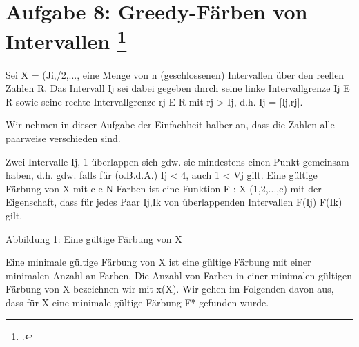 \documentclass{lehramt-informatik-aufgabe}
\begin{document}
\section{Aufgabe 8: Greedy-Färben von Intervallen
\footcite[Thema 1 Aufgabe 8]{examen:66115:2017:09}}

Sei X = (Ji,/2,..., eine Menge von n (geschlossenen) Intervallen über
den reellen Zahlen R. Das Intervall Ij sei dabei gegeben dnrch seine
linke Intervallgrenze Ij E R sowie seine rechte Intervallgrenze rj E R
mit rj > Ij, d.h. Ij = [lj,rj].

Wir nehmen in dieser Aufgabe der Einfachheit halber an, dass die Zahlen
alle paarweise verschieden sind.

Zwei Intervalle Ij, 1 überlappen sich gdw. sie mindestens einen Punkt
gemeinsam haben, d.h. gdw. falls für (o.B.d.A.) Ij < 4, auch 1 < Vj
gilt. Eine gültige Färbung von X mit c e N Farben ist eine Funktion F :
X  (1,2,...,c) mit der Eigenschaft, dass für jedes Paar Ij,Ik von
überlappenden Intervallen F(Ij)  F(Ik) gilt.

Abbildung 1: Eine gültige Färbung von X

Eine minimale gültige Färbung von X ist eine gültige Färbung mit einer
minimalen Anzahl an Farben. Die Anzahl von Farben in einer minimalen
gültigen Färbung von X bezeichnen wir mit x(X). Wir gehen im Folgenden
davon aus, dass für X eine minimale gültige Färbung F* gefunden wurde.
\end{document}
